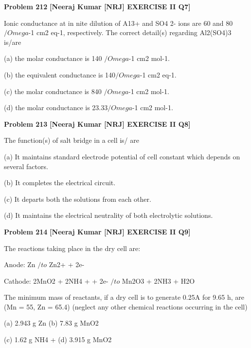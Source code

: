 \begin{problembox}
\textbf{Problem 212} \hfill \textbf{[Neeraj Kumar [NRJ] EXERCISE II Q7]}
\label{q:ext-nrj_all_questions-212}

Ionic conductance at in  nite dilution of A13+ and 
SO4
2- ions are 60 and 80  $/Omega$-1 cm2 eq-1, respectively. 
The correct detail(s) regarding Al2(SO4)3 is/are
 
 (a)  the molar conductance is 140 $/Omega$-1 cm2 mol-1.
 
 (b)  the equivalent conductance is 140$/Omega$-1 cm2 eq-1.
 
 (c)  the molar conductance is 840 $/Omega$-1 cm2 mol-1.
 
 (d)  the molar conductance is 23.33$/Omega$-1 cm2 mol-1.
\end{problembox}

\begin{problembox}
\textbf{Problem 213} \hfill \textbf{[Neeraj Kumar [NRJ] EXERCISE II Q8]}
\label{q:ext-nrj_all_questions-213}

The function(s) of salt bridge in a cell is/ are
 
 (a)  It maintains standard electrode potential of 
cell constant which depends on several factors.
 
 (b)  It completes the electrical circuit.
 
 (c)  It departs both the solutions from each other.
 
 (d)  It maintains the electrical neutrality of both 
electrolytic solutions.
\end{problembox}

\begin{problembox}
\textbf{Problem 214} \hfill \textbf{[Neeraj Kumar [NRJ] EXERCISE II Q9]}
\label{q:ext-nrj_all_questions-214}

The reactions taking place in the dry cell are:
 
  Anode: Zn $/to$ Zn2+ + 2e-
 
  Cathode:  2MnO2 + 2NH4
+ + 2e- $/to$ Mn2O3 + 
2NH3 + H2O
 
 The minimum mass of reactants, if a dry cell is to 
generate 0.25A for 9.65 h, are (Mn = 55, Zn = 65.4) 
(neglect any other chemical reactions occurring in 
the cell)
 
 (a) 2.943 g Zn 
(b) 7.83 g MnO2
 
 (c) 1.62 g NH4
+ 
(d) 3.915 g MnO2
\end{problembox}


